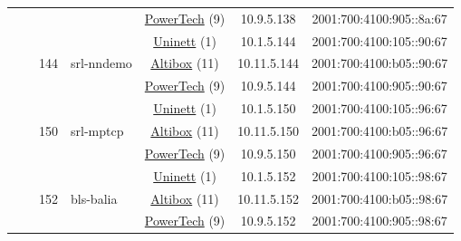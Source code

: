 \begin{small}
\begin{center}
\begin{longtable}{|c|c|c|c|c|c|c|c|}
  &  &  &  & \multicolumn{2}{|c|}{\tiny{\href{http://www.powertech.no}{PowerTech} (9)}} & \tiny{10.9.5.138} & \tiny{2001:700:4100:905::8a:67} \\* \cline{3-3}\cline{4-4}\cline{5-5}\cline{6-6}\cline{7-7}\cline{8-8}
  &  & \multirow{3}{*}{\tiny{144}} & \multicolumn{1}{|l|}{\multirow{3}{*}{\tiny{srl-nndemo}}} & \multicolumn{2}{|c|}{\tiny{\href{https://www.uninett.no}{Uninett} (1)}} & \tiny{10.1.5.144} & \tiny{2001:700:4100:105::90:67} \\* \cline{5-5}\cline{6-6}\cline{7-7}\cline{8-8}
  &  &  &  & \multicolumn{2}{|c|}{\tiny{\href{https://www.altibox.no}{Altibox} (11)}} & \tiny{10.11.5.144} & \tiny{2001:700:4100:b05::90:67} \\* \cline{5-5}\cline{6-6}\cline{7-7}\cline{8-8}
  &  &  &  & \multicolumn{2}{|c|}{\tiny{\href{http://www.powertech.no}{PowerTech} (9)}} & \tiny{10.9.5.144} & \tiny{2001:700:4100:905::90:67} \\* \cline{3-3}\cline{4-4}\cline{5-5}\cline{6-6}\cline{7-7}\cline{8-8}
  &  & \multirow{3}{*}{\tiny{150}} & \multicolumn{1}{|l|}{\multirow{3}{*}{\tiny{srl-mptcp}}} & \multicolumn{2}{|c|}{\tiny{\href{https://www.uninett.no}{Uninett} (1)}} & \tiny{10.1.5.150} & \tiny{2001:700:4100:105::96:67} \\* \cline{5-5}\cline{6-6}\cline{7-7}\cline{8-8}
  &  &  &  & \multicolumn{2}{|c|}{\tiny{\href{https://www.altibox.no}{Altibox} (11)}} & \tiny{10.11.5.150} & \tiny{2001:700:4100:b05::96:67} \\* \cline{5-5}\cline{6-6}\cline{7-7}\cline{8-8}
  &  &  &  & \multicolumn{2}{|c|}{\tiny{\href{http://www.powertech.no}{PowerTech} (9)}} & \tiny{10.9.5.150} & \tiny{2001:700:4100:905::96:67} \\* \cline{3-3}\cline{4-4}\cline{5-5}\cline{6-6}\cline{7-7}\cline{8-8}
  &  & \multirow{3}{*}{\tiny{152}} & \multicolumn{1}{|l|}{\multirow{3}{*}{\tiny{bls-balia}}} & \multicolumn{2}{|c|}{\tiny{\href{https://www.uninett.no}{Uninett} (1)}} & \tiny{10.1.5.152} & \tiny{2001:700:4100:105::98:67} \\* \cline{5-5}\cline{6-6}\cline{7-7}\cline{8-8}
  &  &  &  & \multicolumn{2}{|c|}{\tiny{\href{https://www.altibox.no}{Altibox} (11)}} & \tiny{10.11.5.152} & \tiny{2001:700:4100:b05::98:67} \\* \cline{5-5}\cline{6-6}\cline{7-7}\cline{8-8}
  &  &  &  & \multicolumn{2}{|c|}{\tiny{\href{http://www.powertech.no}{PowerTech} (9)}} & \tiny{10.9.5.152} & \tiny{2001:700:4100:905::98:67} \\* \cline{3-3}\cline{4-4}\cline{5-5}\cline{6-6}\cline{7-7}\cline{8-8}

\end{longtable}
\end{center}
\end{small}
